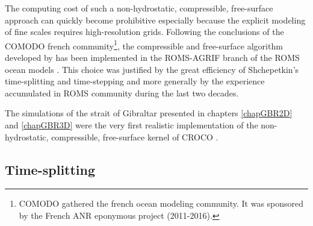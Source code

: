 The computing cost of such a non-hydrostatic, compressible, free-surface approach can quickly become prohibitive especially because the explicit modeling of fine scales requires high-resolution grids. Following the conclusions of the COMODO french community\footnote{COMODO gathered the french ocean modeling community. It was sponsored by the French ANR eponymous project (2011-2016).}, the compressible and free-surface algorithm developed by \cite{Auclair2018} has been implemented in the ROMS-AGRIF branch of the ROMS ocean models \citep{shchepetkin_regional_2005}. This choice was justified by the great efficiency of Shchepetkin's time-splitting and time-stepping and more generally by the experience accumulated in ROMS community during the last two decades.

The simulations of the strait of Gibraltar presented in chapters \ref{chapGBR2D} and \ref{chapGBR3D} were the very first realistic implementation of the non-hydrostatic, compressible, free-surface kernel of CROCO \citep{hilt_2020}.
\color{black}
\subsection{Time-splitting}
